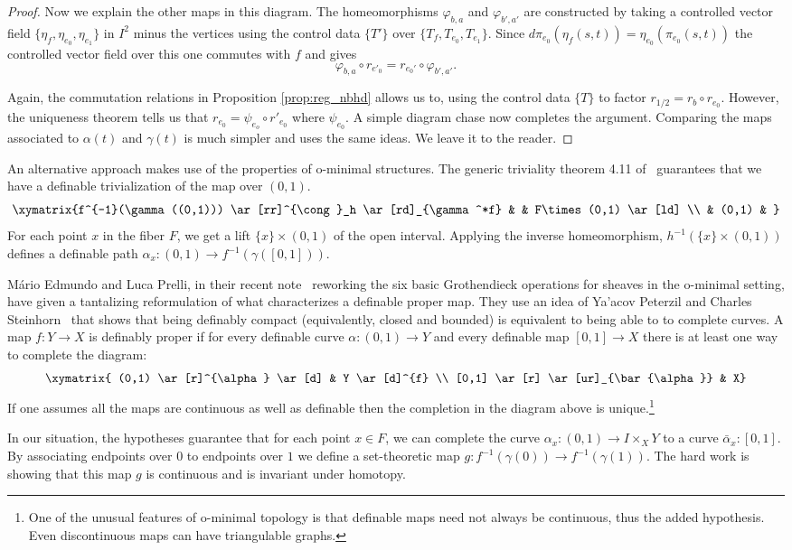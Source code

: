 \begin{proof}
Now we explain the other maps in this diagram. The homeomorphisms $\varphi_{b,a}$ and $\varphi_{b',a'}$ are constructed by taking a controlled vector field $\{\eta_f,\eta_{e_0},\eta_{e_1}\}$ in $I^2$ minus the vertices using the control data $\{T'\}$ over $\{T_f,T_{e_0},T_{e_1}\}$. Since $d\pi_{e_0}(\eta_f(s,t))=\eta_{e_0}(\pi_{e_0}(s,t))$ the controlled vector field over this one commutes with $f$ and gives
\[
\varphi_{b,a}\circ r_{e'_0}=r_{e_0'}\circ\varphi_{b',a'}.
\]

Again, the commutation relations in Proposition \ref{prop:reg_nbhd} allows us to, using the control data $\{T\}$ to factor $r_{1/2}=r_{b}\circ r_{e_0}$. However, the uniqueness theorem tells us that $r_{e_0}=\psi_{e_o}\circ r'_{e_0}$ where $\psi_{e_0}$. A simple diagram chase now completes the argument. Comparing the maps associated to $\alpha(t)$ and $\gamma(t)$ is much simpler and uses the same ideas. We leave it to the reader. 
\end{proof}

\begin{rmk}
	An alternative approach makes use of the properties of o-minimal structures. The generic triviality theorem 4.11 of~\cite{vdd-geocat} guarantees that we have a definable trivialization of the map over $(0,1)$.
	\[
		\xymatrix{f^{-1}(\gamma((0,1))) \ar[rr]^{\cong}_h \ar[rd]_{\gamma^*f} & & F\times (0,1) \ar[ld] \\ & (0,1) & }
	\]
	For each point $x$ in the fiber $F$, we get a lift $\{x\}\times (0,1)$ of the open interval. Applying the inverse homeomorphism, $h^{-1}(\{x\}\times (0,1))$ defines a definable path $\alpha_x:(0,1)\to f^{-1}(\gamma([0,1]))$. 
	
	M\'ario Edmundo and Luca Prelli, in their recent note~\cite{edmundo-six} reworking the six basic Grothendieck operations for sheaves in the o-minimal setting, have given a tantalizing reformulation of what characterizes a definable proper map. They use an idea of Ya'acov Peterzil and Charles Steinhorn~\cite{peterzil-cpt} that shows that being definably compact (equivalently, closed and bounded) is equivalent to being able to to complete curves. A map $f:Y\to X$ is definably proper if for every definable curve $\alpha:(0,1)\to Y$ and every definable map $[0,1]\to X$ there is at least one way to complete the diagram:
	\[
		\xymatrix{ (0,1) \ar[r]^{\alpha} \ar[d] & Y \ar[d]^{f} \\
		[0,1] \ar[r] \ar[ur]_{\bar{\alpha}} & X}
	\]
	If one assumes all the maps are continuous as well as definable then the completion in the diagram above is unique.\footnote{One of the unusual features of o-minimal topology is that definable maps need not always be continuous, thus the added hypothesis. Even discontinuous maps can have triangulable graphs.}
	
	In our situation, the hypotheses guarantee that for each point $x\in F$, we can complete the curve $\alpha_x:(0,1)\to I\times_X Y$ to a curve $\bar{\alpha}_x:[0,1]$. By associating endpoints over $0$ to endpoints over $1$ we define a set-theoretic map $g:f^{-1}(\gamma(0))\to f^{-1}(\gamma(1))$. The hard work is showing that this map $g$ is continuous and is invariant under homotopy.
\end{rmk}
